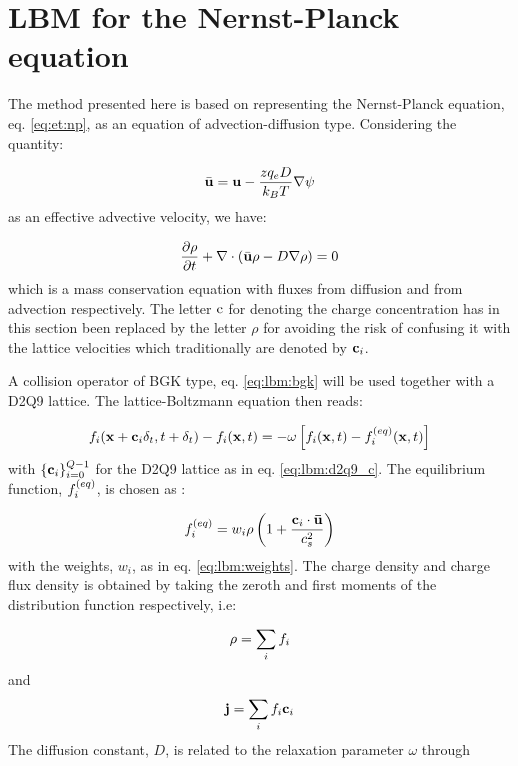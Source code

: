 \section{LBM for the Nernst-Planck equation}\label{sec:lbm:np}
The method presented here is based on representing the Nernst-Planck
equation, eq. \eqref{eq:et:np}, as an equation of advection-diffusion
type. Considering the quantity:  

\begin{equation}\label{eq:lbm:eff_adv}
\bar{\mathbf{u}} = \mathbf{u} -
  \frac{zq_eD}{k_BT}\nabla\mathrm{\psi}
\end{equation}
as an effective advective velocity, we have:

\begin{equation}\label{eq:lbm:adv-dif}
\dfrac{\partial \rho}{\partial t} + \nabla \cdot ( \bar{\mathbf{u}} \rho -
  D\nabla \rho ) = 0
\end{equation}
which is a mass conservation equation with fluxes from diffusion and
from advection respectively. The letter $\mathrm{c}$ for denoting the charge
concentration has in this section been replaced by the letter $\rho$
for avoiding the risk of confusing it with the lattice velocities
which traditionally are denoted by ${\mathbf{c}_i}$.

A collision operator of BGK type, eq. \eqref{eq:lbm:bgk} will be used
together with a D2Q9 lattice. The lattice-Boltzmann equation then
reads:

\begin{equation}
f_i(\mathbf{x} + \mathbf{c}_i\delta_t, t + \delta_t) - f_i(\mathbf{x}, t) = -\omega \left[ f_i(\mathbf{x}, t) - f_i^{(eq)}(\mathbf{x}, t) \right]
\end{equation}
with $\{\mathbf{c}_i\}_{i=0}^{Q-1}$ for the D2Q9 lattice as in
eq. \eqref{eq:lbm:d2q9_c}. The equilibrium function, $f_i^{(eq)}$, is chosen
as \cite{alexey-tobias}:

\begin{equation}\label{eq:lbm:np_feq}
f_i^{(eq)} = w_i \rho \left ( 1 + \frac{\mathbf{c}_i \cdot \mathbf{\bar{u}}}{c_s^2} \right)
\end{equation}
with the weights, $w_i$, as in eq. \eqref{eq:lbm:weights}. The charge
density and charge flux density is obtained by taking the zeroth and
first moments of the distribution function respectively, i.e:

\begin{equation}\label{eq:lbm:rho_mom}
\rho = \sum_i f_i
\end{equation}
and
\begin{equation}\label{eq:lbm:j_mom}
\mathbf{j} = \sum_i f_i \mathbf{c}_i
\end{equation}
The diffusion constant, $D$, is related to the relaxation parameter
$\omega$ through 

